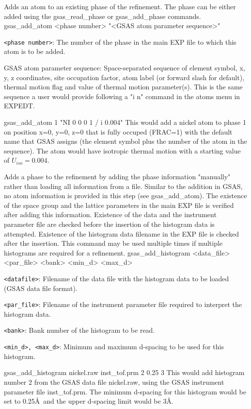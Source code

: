 {
Adds an atom to an existing phase of the refinement. The phase can be either added using the gsas\_read\_phase or gsas\_add\_phase commands.
}{
gsas\_add\_atom <phase number> "<GSAS atom parameter sequence>"
}{
\item \texttt{<phase number>}: The number of the phase in the main EXP file to which this atom is to be added.
\item GSAS atom parameter sequence: Space-separated sequence of element symbol, x, y, z coordinates, site occupation factor, atom label (or forward slash for default), thermal motion flag and value of thermal motion parameter(s). This is the same sequence a user would provide following a "i n" command in the atoms menu in EXPEDT.
}{
gsas\_add\_atom 1 "NI 0 0 0 1 / i 0.004"
}{
This would add a nickel atom to phase 1 on position x=0, y=0, z=0 that is fully occuped (FRAC=1) with the default name that GSAS assigns (the element symbol plus the number of the atom in the sequence). The atom would have isotropic thermal motion with a starting value of $U_{iso}=0.004$.
}

{
Adds a phase to the refinement by adding the phase information "manually" rather than loading all information from a file. Similar to the addition in GSAS, no atom information is provided in this step (see gsas\_add\_atom). The existence of the space group and the lattice parameters in the main EXP file is verified after adding this information. Existence of the data and the instrument parameter file are checked before the insertion of the histogram data is attempted. Existence of the histogram data filename in the EXP file is checked after the insertion. This command may be used multiple times if multiple histograms are required for a refinement.
}{
gsas\_add\_histogram <data\_file> <par\_file> <bank> <min\_d> <max\_d>
}{
\item \texttt{<datafile>}: Filename of the data file with the histogram data to be loaded (GSAS data file format).
\item \texttt{<par\_file>}: Filename of the instrument parameter file required to interpret the histogram data.
\item \texttt{<bank>}: Bank number of the histogram to be read.
\item \texttt{<min\_d>, <max\_d>}: Minimum and maximum d-spacing to be used for this histogram.
}{
gsas\_add\_histogram nickel.raw inst\_tof.prm 2 0.25 3
}{
This would add histogram number 2 from the GSAS data file nickel.raw, using the GSAS instrument parameter file inst\_tof.prm. The minimum d-spacing for this histogram would be set to 0.25\AA\ and the upper d-spacing limit would be 3\AA.
}

